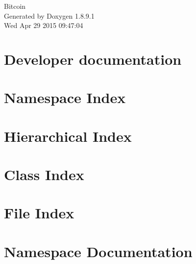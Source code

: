 \documentclass[twoside]{book}
\newcommand{\+}{\discretionary{\mbox{\scriptsize$\hookleftarrow$}}{}{}}
\newcommand{\clearemptydoublepage}{%
  \newpage{\pagestyle{empty}\cleardoublepage}%
}
\begin{document}
\hypersetup{pageanchor=false,
             bookmarks=true,
             bookmarksnumbered=true,
             pdfencoding=unicode
            }
\begin{titlepage}
\vspace*{7cm}
\begin{center}%
{\Large Bitcoin }\\
\vspace*{1cm}
{\large Generated by Doxygen 1.8.9.1}\\
\vspace*{0.5cm}
{\small Wed Apr 29 2015 09:47:04}\\
\end{center}
\end{titlepage}
\clearemptydoublepage
\tableofcontents
\clearemptydoublepage
{}
\hypersetup{pageanchor=true}

\chapter{Developer documentation}
\label{index}\hypertarget{index}{}
\chapter{Namespace Index}

\chapter{Hierarchical Index}

\chapter{Class Index}

\chapter{File Index}

\chapter{Namespace Documentation}








\end{document}
